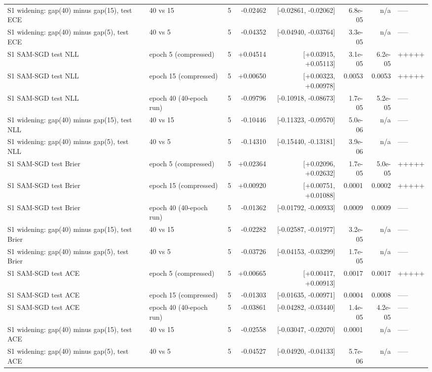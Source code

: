 \documentclass[11pt,letterpaper]{article}
\begin{document}
{\begin{longtable}{>{\raggedright\arraybackslash}p{3.6cm}lrrrrrl}
S1 widening: gap(40) minus gap(15), test ECE & 40 vs 15 & 5 & -0.02462 & [-0.02861, -0.02062] & 6.8e-05 & n/a & ----- \\
S1 widening: gap(40) minus gap(5), test ECE & 40 vs 5 & 5 & -0.04352 & [-0.04940, -0.03764] & 3.3e-05 & n/a & ----- \\
S1 SAM-SGD test NLL & epoch 5 (compressed) & 5 & +0.04514 & [+0.03915, +0.05113] & 3.1e-05 & 6.2e-05 & +++++ \\
S1 SAM-SGD test NLL & epoch 15 (compressed) & 5 & +0.00650 & [+0.00323, +0.00978] & 0.0053 & 0.0053 & +++++ \\
S1 SAM-SGD test NLL & epoch 40 (40-epoch run) & 5 & -0.09796 & [-0.10918, -0.08673] & 1.7e-05 & 5.2e-05 & ----- \\
S1 widening: gap(40) minus gap(15), test NLL & 40 vs 15 & 5 & -0.10446 & [-0.11323, -0.09570] & 5.0e-06 & n/a & ----- \\
S1 widening: gap(40) minus gap(5), test NLL & 40 vs 5 & 5 & -0.14310 & [-0.15440, -0.13181] & 3.9e-06 & n/a & ----- \\
S1 SAM-SGD test Brier & epoch 5 (compressed) & 5 & +0.02364 & [+0.02096, +0.02632] & 1.7e-05 & 5.0e-05 & +++++ \\
S1 SAM-SGD test Brier & epoch 15 (compressed) & 5 & +0.00920 & [+0.00751, +0.01088] & 0.0001 & 0.0002 & +++++ \\
S1 SAM-SGD test Brier & epoch 40 (40-epoch run) & 5 & -0.01362 & [-0.01792, -0.00933] & 0.0009 & 0.0009 & ----- \\
S1 widening: gap(40) minus gap(15), test Brier & 40 vs 15 & 5 & -0.02282 & [-0.02587, -0.01977] & 3.2e-05 & n/a & ----- \\
S1 widening: gap(40) minus gap(5), test Brier & 40 vs 5 & 5 & -0.03726 & [-0.04153, -0.03299] & 1.7e-05 & n/a & ----- \\
S1 SAM-SGD test ACE & epoch 5 (compressed) & 5 & +0.00665 & [+0.00417, +0.00913] & 0.0017 & 0.0017 & +++++ \\
S1 SAM-SGD test ACE & epoch 15 (compressed) & 5 & -0.01303 & [-0.01635, -0.00971] & 0.0004 & 0.0008 & ----- \\
S1 SAM-SGD test ACE & epoch 40 (40-epoch run) & 5 & -0.03861 & [-0.04282, -0.03440] & 1.4e-05 & 4.2e-05 & ----- \\
S1 widening: gap(40) minus gap(15), test ACE & 40 vs 15 & 5 & -0.02558 & [-0.03047, -0.02070] & 0.0001 & n/a & ----- \\
S1 widening: gap(40) minus gap(5), test ACE & 40 vs 5 & 5 & -0.04527 & [-0.04920, -0.04133] & 5.7e-06 & n/a & ----- \\

\end{longtable}}
\end{document}

